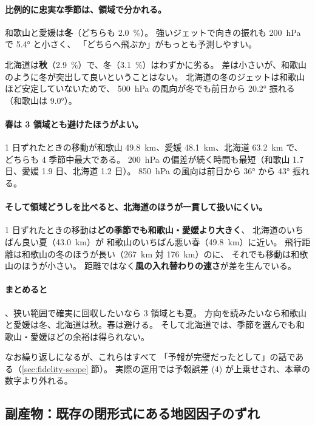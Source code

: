 \paragraph{比例的に忠実な季節は、領域で分かれる。}
和歌山と愛媛は\textbf{冬}（どちらも \SI{2.0}{\percent}）。
強いジェットで向きの振れも \SI{200}{\hecto\pascal} で \ang{5.4} と小さく、
「どちらへ飛ぶか」がもっとも予測しやすい。

北海道は\textbf{秋}（\SI{2.9}{\percent}）で、冬（\SI{3.1}{\percent}）はわずかに劣る。
差は小さいが、和歌山のように冬が突出して良いということはない。
北海道の冬のジェットは和歌山ほど安定していないためで、
\SI{500}{\hecto\pascal} の風向が冬でも前日から \ang{20.2} 振れる
（和歌山は \ang{9.0}）。

\paragraph{春は 3 領域とも避けたほうがよい。}
1 日ずれたときの移動が和歌山 \SI{49.8}{\kilo\metre}、愛媛 \SI{48.1}{\kilo\metre}、北海道 \SI{63.2}{\kilo\metre} で、
どちらも 4 季節中最大である。
\SI{200}{\hecto\pascal} の偏差が続く時間も最短（和歌山 \num{1.7} 日、愛媛 \num{1.9} 日、北海道 \num{1.2} 日）。
\SI{850}{\hecto\pascal} の風向は前日から \ang{36} から \ang{43} 振れる。

\paragraph{そして領域どうしを比べると、北海道のほうが一貫して扱いにくい。}
1 日ずれたときの移動は\textbf{どの季節でも和歌山・愛媛より大きく}、
北海道のいちばん良い夏（\SI{43.0}{\kilo\metre}）が
和歌山のいちばん悪い春（\SI{49.8}{\kilo\metre}）に近い。
飛行距離は和歌山の冬のほうが長い（\SI{267}{\kilo\metre} 対 \SI{176}{\kilo\metre}）のに、
それでも移動は和歌山のほうが小さい。
距離ではなく\textbf{風の入れ替わりの速さ}が差を生んでいる。

\paragraph{まとめると}、狭い範囲で確実に回収したいなら 3 領域とも夏。
方向を読みたいなら和歌山と愛媛は冬、北海道は秋。春は避ける。
そして北海道では、季節を選んでも和歌山・愛媛ほどの余裕は得られない。

なお繰り返しになるが、これらはすべて
「予報が完璧だったとして」の話である（\ref{sec:fidelity-scope} 節）。
実際の運用では予報誤差 (4) が上乗せされ、本章の数字より外れる。

\subsection{副産物：既存の閉形式にある地図因子のずれ}
\label{sec:fidelity-mapfactor}

